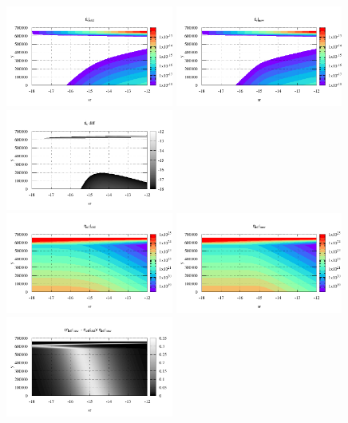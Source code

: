 \begin{itemize}
\begin{center}
\includegraphics[width=5.5cm]{images/rheology/example/map_sr_v_old-1}
\includegraphics[width=5.5cm]{images/rheology/example/map_sr_v_new-1}
\includegraphics[width=5.5cm]{images/rheology/example/map_sr_v_diff-1}\\
\includegraphics[width=5.5cm]{images/rheology/example/map_etaeff_old-1}
\includegraphics[width=5.5cm]{images/rheology/example/map_etaeff_new-1}
\includegraphics[width=5.5cm]{images/rheology/example/map_etaeff_diff-1}\\

\end{center}
\end{itemize}
